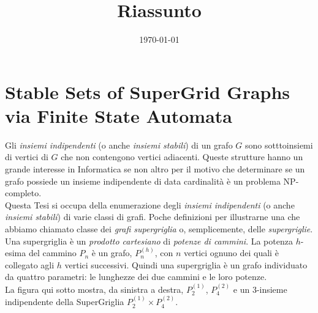 \documentclass{amsart}
\theoremstyle{definition}
\theoremstyle{remark}
\theoremstyle{remark}
\theoremstyle{remark}
\theoremstyle{remark}
\theoremstyle{definition}
\theoremstyle{remark}
\theoremstyle{definition}
\theoremstyle{definition}
\begin{document}
\title{Riassunto}





\date{\today} 

\maketitle  

\section{Stable Sets of SuperGrid Graphs via Finite State Automata} 

Gli \emph{insiemi indipendenti} (o anche \emph{insiemi stabili}) di un grafo $G$ sono sotttoinsiemi di vertici di $G$ che non contengono vertici adiacenti. Queste strutture hanno un grande interesse in Informatica se non altro per il motivo che determinare se un grafo possiede un insieme indipendente di data cardinalit\`a \`e un problema NP-completo.\\  

Questa Tesi si occupa della enumerazione degli \emph{insiemi indipendenti} (o anche \emph{insiemi stabili}) di varie classi di grafi. Poche definizioni per illustrarne una che abbiamo chiamato classe dei \emph{grafi supergriglia} o, semplicemente, delle \emph{supergriglie}. Una supergriglia \`e un \emph{prodotto cartesiano} di \emph{potenze di cammini}. La potenza $h$-esima del cammino $P_n$ \`e un grafo, $P_n^{(h)}$, con $n$ vertici ognuno dei quali \`e collegato agli $h$ vertici successivi. Quindi una supergriglia \`e un grafo individuato da quattro parametri: le lunghezze dei due cammini e le loro potenze.\\  

La figura qui sotto mostra, da sinistra a destra, $P_2^{(1)}$, $P_4^{(2)}$ e un $3$-insieme indipendente della SuperGriglia $P_2^{(1)}\times P_4^{(2)}$.
\end{document}
